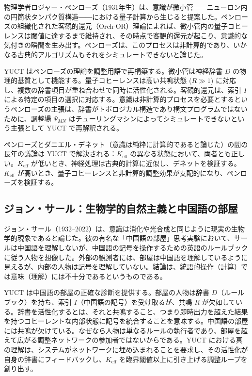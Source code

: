 \documentclass[12pt,a4paper]{article}
\begin{document}
	物理学者ロジャー・ペンローズ（1931年生）は、意識が微小管――ニューロン内の円筒状タンパク質構造――における量子計算から生じると提案した。ペンローズの組織化された客観的還元（Orch-OR）理論によれば、微小管内の量子コヒーレンスは閾値に達するまで維持され、その時点で客観的還元が起こり、意識的な気付きの瞬間を生み出す。ペンローズは、このプロセスは非計算的であり、いかなる古典的アルゴリズムもそれをシミュレートできないと論じた。
	
	YUCT はペンローズの理論を調整用語で再構築する。微小管は神経辞書 \(D\) の物理的基質として機能する。量子コヒーレンスは高い共鳴状態 (\(R \gg 1\)) に対応し、複数の辞書項目が重ね合わせで同時に活性化される。客観的還元は、索引 \(I\) による特定の項目の選択に対応する。意識は非計算的プロセスを必要とするというペンローズの主張は、辞書がトポロジカル構造であり構文プログラムではないために、調整場 \(\Psi_{MN}\) はチューリングマシンによってシミュレートできないという主張として YUCT で再解釈される。
	
	ペンローズとダニエル・デネット（意識は純粋に計算的であると論じた）の間の長年の議論は YUCT で解決される：\(K_{\mathrm{eff}}\) の異なる状態において、両者とも正しい。\(K_{\mathrm{eff}}\) が低いとき、神経処理は古典的計算に近似し、デネットを検証する。\(K_{\mathrm{eff}}\) が高いとき、量子コヒーレンスと非計算的調整効果が支配的になり、ペンローズを検証する。
	
	\subsection{ジョン・サール：生物学的自然主義と中国語の部屋}
	
	ジョン・サール（1932–2022）は、意識は消化や光合成と同じように現実の生物学的現象であると論じた。彼の有名な「中国語の部屋」思考実験において、サールは中国語を理解しないが、中国語の記号を操作するための英語のルールブックに従う人物を想像した。外部の観測者には、部屋は中国語を理解しているように見えるが、内部の人物は記号を理解していない。結論は、統語的操作（計算）では意味（理解）には不十分であるというものである。
	
	YUCT は中国語の部屋の正確な診断を提供する。部屋の人物は辞書 \(D\)（ルールブック）を持ち、索引 \(I\)（中国語の記号）を受け取るが、共鳴 \(R\) が欠如している。辞書を活性化するとは、それと共鳴すること、つまり即時出力を超えた結果を持つコヒーレントな内部状態に記号を統合することを意味する。中国語の部屋には共鳴が欠けている。なぜなら人物は単なるルールの執行者であり、部屋を超えて広がる調整ネットワークの参加者ではないからである。YUCT における真の理解は、システムがネットワークに埋め込まれることを要求し、その活性化が自身の辞書にフィードバックし、\(K_{\mathrm{eff}}\) を臨界閾値以上に引き上げる調整ループを創り出す。
	
\end{document}
